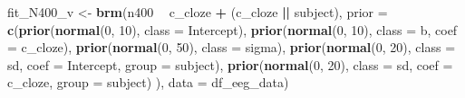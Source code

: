 \documentclass[12pt,ignorenonframetext,aspectratio=169]{beamer}
\newenvironment{Shaded}{\begin{snugshade}}{\end{snugshade}}
\newcommand{\DataTypeTok}[1]{\textcolor[rgb]{0.13,0.29,0.53}{#1}}
\newcommand{\DecValTok}[1]{\textcolor[rgb]{0.00,0.00,0.81}{#1}}
\newcommand{\KeywordTok}[1]{\textcolor[rgb]{0.13,0.29,0.53}{\textbf{#1}}}
\newcommand{\NormalTok}[1]{#1}
\newcommand{\OperatorTok}[1]{\textcolor[rgb]{0.81,0.36,0.00}{\textbf{#1}}}
\newcommand{\StringTok}[1]{\textcolor[rgb]{0.31,0.60,0.02}{#1}}
\begin{document}
\begin{frame}[fragile]

\scriptsize

\begin{Shaded}
\begin{Highlighting}[]
\NormalTok{fit_N400_v <-}\StringTok{ }\KeywordTok{brm}\NormalTok{(n400 }\OperatorTok{~}\StringTok{ }\NormalTok{c_cloze }\OperatorTok{+}\StringTok{ }\NormalTok{(c_cloze }\OperatorTok{||}\StringTok{ }\NormalTok{subject),}
               \DataTypeTok{prior =}
                 \KeywordTok{c}\NormalTok{(}\KeywordTok{prior}\NormalTok{(}\KeywordTok{normal}\NormalTok{(}\DecValTok{0}\NormalTok{, }\DecValTok{10}\NormalTok{), }\DataTypeTok{class =}\NormalTok{ Intercept),}
                   \KeywordTok{prior}\NormalTok{(}\KeywordTok{normal}\NormalTok{(}\DecValTok{0}\NormalTok{, }\DecValTok{10}\NormalTok{), }\DataTypeTok{class =}\NormalTok{ b, }\DataTypeTok{coef =}\NormalTok{ c_cloze),}
                   \KeywordTok{prior}\NormalTok{(}\KeywordTok{normal}\NormalTok{(}\DecValTok{0}\NormalTok{, }\DecValTok{50}\NormalTok{), }\DataTypeTok{class =}\NormalTok{ sigma),}
                   \KeywordTok{prior}\NormalTok{(}\KeywordTok{normal}\NormalTok{(}\DecValTok{0}\NormalTok{, }\DecValTok{20}\NormalTok{), }\DataTypeTok{class =}\NormalTok{ sd, }\DataTypeTok{coef =}\NormalTok{ Intercept,}
                         \DataTypeTok{group =}\NormalTok{ subject),}
                   \KeywordTok{prior}\NormalTok{(}\KeywordTok{normal}\NormalTok{(}\DecValTok{0}\NormalTok{, }\DecValTok{20}\NormalTok{), }\DataTypeTok{class =}\NormalTok{ sd, }\DataTypeTok{coef =}\NormalTok{ c_cloze,}
                         \DataTypeTok{group =}\NormalTok{ subject)}
\NormalTok{                   ),}
               \DataTypeTok{data =}\NormalTok{ df_eeg_data)}
\end{Highlighting}
\end{Shaded}

\normalsize

\end{frame}
\end{document}
